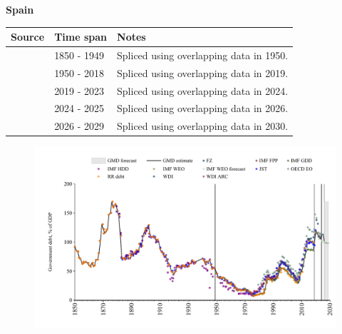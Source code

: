 \documentclass[12pt,a4paper,landscape]{article}
\begin{document}
\begin{adjustbox}{max totalsize={\paperwidth}{\paperheight},center}
\begin{minipage}[t][\textheight][t]{\textwidth}
\vspace*{0.5cm}
{}
\begin{center}
{\Large\bfseries Spain}
\end{center}
\vspace{0.5cm}
\begin{table}[H]
\centering
\small
\begin{tabular}{|l|l|l|}
\hline
\textbf{Source} & \textbf{Time span} & \textbf{Notes} \\
\hline
\rowcolor{white}\cite{IMF_FPP}& 1850 - 1949 &Spliced using overlapping data in 1950.\\
\rowcolor{lightgray}\cite{IMF_GDD}& 1950 - 2018 &Spliced using overlapping data in 2019.\\
\rowcolor{white}\cite{IMF_FPP}& 2019 - 2023 &Spliced using overlapping data in 2024.\\
\rowcolor{lightgray}\cite{OECD_EO}& 2024 - 2025 &Spliced using overlapping data in 2026.\\
\rowcolor{white}\cite{IMF_WEO_forecast}& 2026 - 2029 &Spliced using overlapping data in 2030.\\
\hline
\end{tabular}
\end{table}
\begin{figure}[H]
\centering
\includegraphics[width=\textwidth,height=0.6\textheight,keepaspectratio]{graphs/ESP_govdebt_GDP.pdf}
\end{figure}
\end{minipage}
\end{adjustbox}
\end{document}

